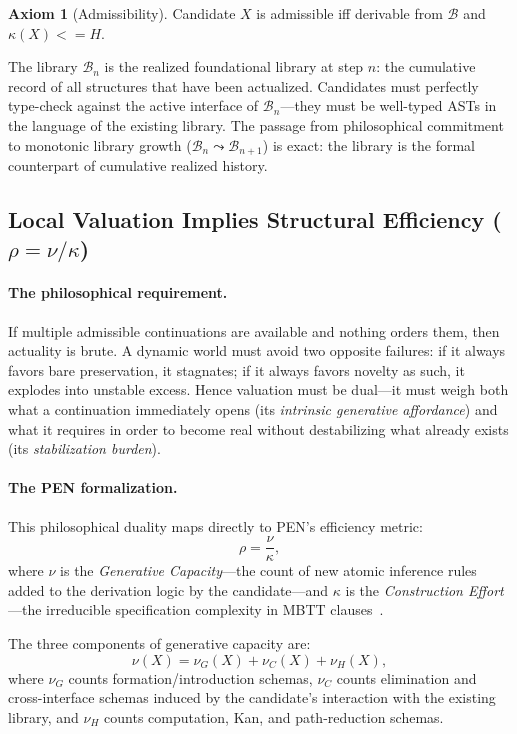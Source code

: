 \documentclass[11pt,a4paper]{article}
\def\leq{<=}%
\theoremstyle{plain}
\theoremstyle{definition}
\newtheorem{axiom}[theorem]{Axiom}
\theoremstyle{remark}
\newcommand{\B}{\mathcal{B}}
\begin{document}
\begin{axiom}[Admissibility]
Candidate $X$ is admissible iff derivable from $\B$ and $\kappa(X) \leq H$.
\end{axiom}

The library $\B_n$ is the realized foundational library at step $n$: the cumulative record of all structures that have been actualized.  Candidates must perfectly type-check against the active interface of $\B_n$---they must be well-typed ASTs in the language of the existing library.  The passage from philosophical commitment to monotonic library growth ($\B_n \leadsto \B_{n+1}$) is exact: the library is the formal counterpart of cumulative realized history.


\subsection{Local Valuation Implies Structural Efficiency \texorpdfstring{($\rho = \nu / \kappa$)}{(rho = nu / kappa)}}
\label{sec:valuation}

\paragraph{The philosophical requirement.}
If multiple admissible continuations are available and nothing orders them, then actuality is brute.  A dynamic world must avoid two opposite failures: if it always favors bare preservation, it stagnates; if it always favors novelty as such, it explodes into unstable excess.  Hence valuation must be dual---it must weigh both what a continuation immediately opens (its \emph{intrinsic generative affordance}) and what it requires in order to become real without destabilizing what already exists (its \emph{stabilization burden}).

\paragraph{The PEN formalization.}
This philosophical duality maps directly to PEN's efficiency metric:
\begin{equation}
\label{eq:rho}
\rho = \frac{\nu}{\kappa},
\end{equation}
where $\nu$ is the \emph{Generative Capacity}---the count of new atomic inference rules added to the derivation logic by the candidate---and $\kappa$ is the \emph{Construction Effort}---the irreducible specification complexity in MBTT clauses~\cite{pen2026}.

The three components of generative capacity are:
\[
  \nu(X) = \nu_G(X) + \nu_C(X) + \nu_H(X),
\]
where $\nu_G$ counts formation/introduction schemas, $\nu_C$ counts elimination and cross-interface schemas induced by the candidate's interaction with the existing library, and $\nu_H$ counts computation, Kan, and path-reduction schemas.  
\end{document}
